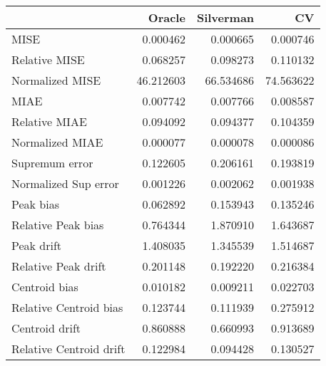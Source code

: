 \begin{tabular}{lrrr}
  \toprule
 & Oracle & Silverman & CV \\ 
  \midrule
MISE & 0.000462 & 0.000665 & 0.000746 \\ 
  Relative MISE & 0.068257 & 0.098273 & 0.110132 \\ 
  Normalized MISE & 46.212603 & 66.534686 & 74.563622 \\ 
  MIAE & 0.007742 & 0.007766 & 0.008587 \\ 
  Relative MIAE & 0.094092 & 0.094377 & 0.104359 \\ 
  Normalized MIAE & 0.000077 & 0.000078 & 0.000086 \\ 
  Supremum error & 0.122605 & 0.206161 & 0.193819 \\ 
  Normalized Sup error & 0.001226 & 0.002062 & 0.001938 \\ 
  Peak bias & 0.062892 & 0.153943 & 0.135246 \\ 
  Relative Peak bias & 0.764344 & 1.870910 & 1.643687 \\ 
  Peak drift & 1.408035 & 1.345539 & 1.514687 \\ 
  Relative Peak drift & 0.201148 & 0.192220 & 0.216384 \\ 
  Centroid bias & 0.010182 & 0.009211 & 0.022703 \\ 
  Relative Centroid bias & 0.123744 & 0.111939 & 0.275912 \\ 
  Centroid drift & 0.860888 & 0.660993 & 0.913689 \\ 
  Relative Centroid drift & 0.122984 & 0.094428 & 0.130527 \\ 
   \bottomrule
\end{tabular}
